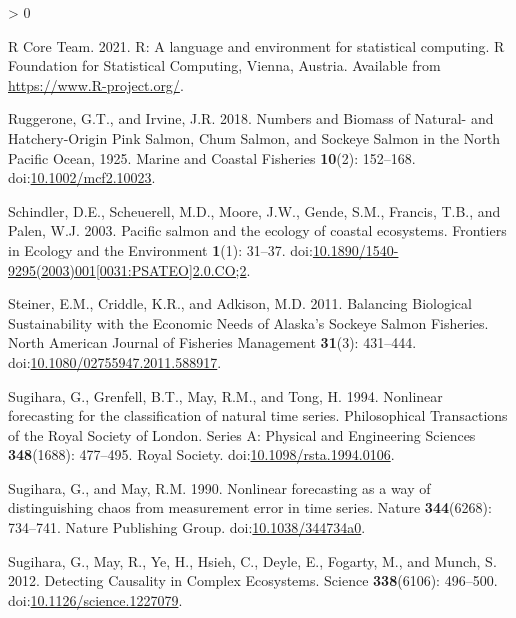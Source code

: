 \documentclass[
]{article}
\newlength{\cslhangindent}
\newenvironment{CSLReferences}[2] %
 {%
  \setlength{\parindent}{0pt}
  \ifodd #1 \everypar{\setlength{\hangindent}{\cslhangindent}}\ignorespaces\fi
  \ifnum #2 > 0
  \setlength{\parskip}{#2\baselineskip}
  \fi
 }%
 {}
\begin{document}
\begin{CSLReferences}{1}{0}
\leavevmode\hypertarget{ref-rcoreteam2021}{}%
R Core Team. 2021. R: A language and environment for statistical computing. R Foundation for Statistical Computing, Vienna, Austria. Available from \url{https://www.R-project.org/}.

\leavevmode\hypertarget{ref-ruggerone2018}{}%
Ruggerone, G.T., and Irvine, J.R. 2018. Numbers and {Biomass} of {Natural}- and {Hatchery}-{Origin Pink Salmon}, {Chum Salmon}, and {Sockeye Salmon} in the {North Pacific Ocean}, 1925{}. Marine and Coastal Fisheries \textbf{10}(2): 152--168. doi:\href{https://doi.org/10.1002/mcf2.10023}{10.1002/mcf2.10023}.

\leavevmode\hypertarget{ref-schindler2003}{}%
Schindler, D.E., Scheuerell, M.D., Moore, J.W., Gende, S.M., Francis, T.B., and Palen, W.J. 2003. Pacific salmon and the ecology of coastal ecosystems. Frontiers in Ecology and the Environment \textbf{1}(1): 31--37. doi:\href{https://doi.org/10.1890/1540-9295(2003)001\%5B0031:PSATEO\%5D2.0.CO;2}{10.1890/1540-9295(2003)001{[}0031:PSATEO{]}2.0.CO;2}.

\leavevmode\hypertarget{ref-steiner2011}{}%
Steiner, E.M., Criddle, K.R., and Adkison, M.D. 2011. Balancing {Biological Sustainability} with the {Economic Needs} of {Alaska}'s {Sockeye Salmon Fisheries}. North American Journal of Fisheries Management \textbf{31}(3): 431--444. doi:\href{https://doi.org/10.1080/02755947.2011.588917}{10.1080/02755947.2011.588917}.

\leavevmode\hypertarget{ref-sugihara1994}{}%
Sugihara, G., Grenfell, B.T., May, R.M., and Tong, H. 1994. Nonlinear forecasting for the classification of natural time series. Philosophical Transactions of the Royal Society of London. Series A: Physical and Engineering Sciences \textbf{348}(1688): 477--495. {Royal Society}. doi:\href{https://doi.org/10.1098/rsta.1994.0106}{10.1098/rsta.1994.0106}.

\leavevmode\hypertarget{ref-sugihara1990}{}%
Sugihara, G., and May, R.M. 1990. Nonlinear forecasting as a way of distinguishing chaos from measurement error in time series. Nature \textbf{344}(6268): 734--741. {Nature Publishing Group}. doi:\href{https://doi.org/10.1038/344734a0}{10.1038/344734a0}.

\leavevmode\hypertarget{ref-sugihara2012}{}%
Sugihara, G., May, R., Ye, H., Hsieh, C., Deyle, E., Fogarty, M., and Munch, S. 2012. Detecting {Causality} in {Complex Ecosystems}. Science \textbf{338}(6106): 496--500. doi:\href{https://doi.org/10.1126/science.1227079}{10.1126/science.1227079}.


\end{CSLReferences}
\end{document}
